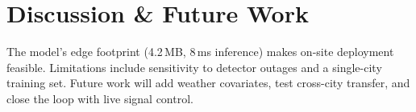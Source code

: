 \section{Discussion \& Future Work}
The model's edge footprint (4.2\,MB, 8\,ms inference) makes on-site deployment feasible.
Limitations include sensitivity to detector outages and a single-city training set. Future
work will add weather covariates, test cross-city transfer, and close the loop with live
signal control.
